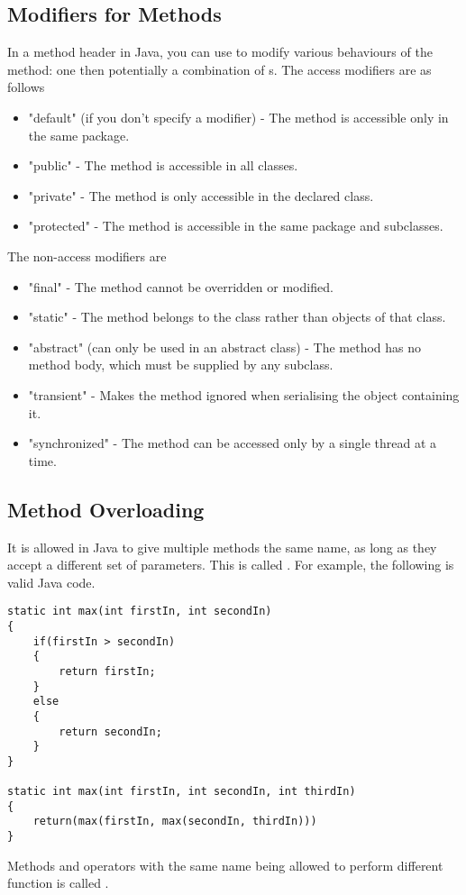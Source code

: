 \documentclass[11pt]{report}
\begin{document}
\subsection{Modifiers for Methods}
In a method header in Java, you can use  to modify various behaviours of the method: one  then potentially a combination of s. The access modifiers are as follows
\begin{itemize}
    \item \inlineJava"default" (if you don't specify a modifier) - The method is accessible only in the same package.
    \item \inlineJava"public" - The method is accessible in all classes.
    \item \inlineJava"private" - The method is only accessible in the declared class.
    \item \inlineJava"protected" - The method is accessible in the same package and subclasses.
\end{itemize}
The non-access modifiers are
\begin{itemize}
    \item \inlineJava"final" - The method cannot be overridden or modified.
    \item \inlineJava"static" - The method belongs to the class rather than objects of that class.
    \item \inlineJava"abstract" (can only be used in an abstract class) - The method has no method body, which must be supplied by any subclass.
    \item \inlineJava"transient" - Makes the method ignored when serialising the object containing it.
    \item \inlineJava"synchronized" - The method can be accessed only by a single thread at a time.
\end{itemize}
\pagebreak
\subsection{Method Overloading}
It is allowed in Java to give multiple methods the same name, as long as they accept a different set of parameters. This is called . For example, the following is valid Java code.
\begin{lstlisting}
static int max(int firstIn, int secondIn)
{
    if(firstIn > secondIn)
    {
        return firstIn;
    }
    else
    {
        return secondIn;
    }
}

static int max(int firstIn, int secondIn, int thirdIn)
{
    return(max(firstIn, max(secondIn, thirdIn)))
}
\end{lstlisting}
\begin{defi}[Polymorphism]
    Methods and operators with the same name being allowed to perform different function is called .
\end{defi}
\pagebreak
\end{document}
